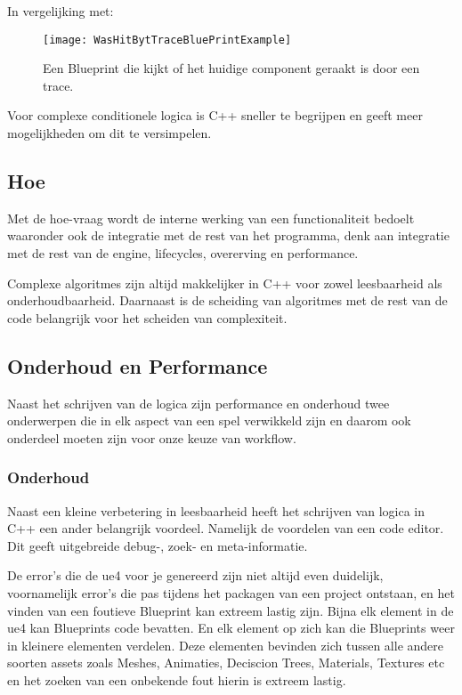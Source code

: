 In vergelijking met:

\begin{figure}[!ht]
  \centering
    \texttt{[image: WasHitBytTraceBluePrintExample]}
    \caption{Een Blueprint die kijkt of het huidige component geraakt is door een trace.}
\end{figure}

Voor complexe conditionele logica is C++ sneller te begrijpen en geeft meer mogelijkheden om dit te versimpelen. 

\subsection{Hoe}
Met de hoe-vraag wordt de interne werking van een functionaliteit bedoelt waaronder ook de integratie met de rest van het programma, denk aan integratie met de rest van de engine, lifecycles, overerving en performance.

Complexe algoritmes zijn altijd makkelijker in C++ voor zowel leesbaarheid als onderhoudbaarheid. Daarnaast is de scheiding van algoritmes met de rest van de code belangrijk voor het scheiden van complexiteit.

\subsection{Onderhoud en Performance}
Naast het schrijven van de logica zijn performance en onderhoud twee onderwerpen die in elk aspect van een spel verwikkeld zijn en daarom ook onderdeel moeten zijn voor onze keuze van workflow.

\subsubsection{Onderhoud}
Naast een kleine verbetering in leesbaarheid heeft het schrijven van logica in C++ een ander belangrijk voordeel. Namelijk de voordelen van een code editor. Dit geeft uitgebreide debug-, zoek- en meta-informatie. 

De error’s die de \gls{ue4} voor je genereerd zijn niet altijd even duidelijk, voornamelijk error’s die pas tijdens het packagen van een project ontstaan, en het vinden van een foutieve Blueprint kan extreem lastig zijn. Bijna elk element in de \gls{ue4} kan Blueprints code bevatten. En elk element op zich kan die Blueprints weer in kleinere elementen verdelen. Deze elementen bevinden zich tussen alle andere soorten assets zoals Meshes, Animaties, Deciscion Trees, Materials, Textures etc en het zoeken van een onbekende fout hierin is extreem lastig.


